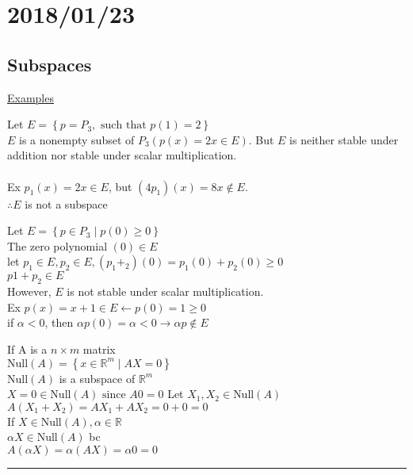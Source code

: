 \documentclass[12pt]{article}
\newcommand{\real}[0]{\mathbb{R}}
\newenvironment{proof}{\block[Proof]}{\endblock}
\newenvironment{examples}{\shownto{-,compact}\underline{Examples}\enumerate}{\endenumerate\divider\endshownto}
\newcommand{\bb}[1]{\left\{#1\right\}}
\newcommand{\divider}[0]{\par\textcolor{lightgray}{\rule{\textwidth}{0.1pt}}}
\begin{document}
\section{2018/01/23}

\subsection{Subspaces}

\begin{examples}
	\item Let $E = \bb{p = P_3, \text{ such that } p(1) = 2}$ \\
	$E$ is a nonempty subset of $P_3 (p(x) = 2x \in E)$. But $E$ is neither stable under addition nor stable under scalar multiplication. \\\\
	Ex $p_1(x) = 2x \in E$, but $(4p_1)(x) = 8x \notin E$. \\
	$\therefore E$ is not a subspace 
	
	\item Let $E = \bb{p \in P_3 \mid p(0) \ge 0}$ \\
	The zero polynomial $(0) \in E$ \\
	let $p_1 \in E, p_2 \in E, (p_1 + _2)(0) = p_1(0) + p_2(0) \ge 0$ \\
	$p1 + p_2 \in E$ \\
	However, $E$ is not stable under scalar multiplication. \\
	Ex $p(x) = x + 1 \in E \leftarrow p(0) = 1 \ge 0$ \\
	if $\alpha < 0$, then $\alpha p(0) = \alpha < 0 \rightarrow \alpha p \notin E$
	
	\item If A is a $n \times m$ matrix \\
	$\text{Null}(A) = \bb{x \in \real^m \mid AX = 0}$ \\
	$\text{Null}(A)$ is a subspace of $\real^m$ \\
	\begin{proof}
		$X = 0 \in \text{Null}(A) \text{ since } A0 = 0$
		Let $X_1, X_2 \in \text{Null}(A)$ \\
		$A(X_1 + X_2) = AX_1 + AX_2 = 0 + 0 = 0$ \\
		If $X \in \text{Null}(A), \alpha \in \real$ \\
		$\alpha X \in \text{Null}(A)$ bc \\
		$A(\alpha X) = \alpha (AX) = \alpha 0 = 0$
	\end{proof}
\end{examples}
\end{document}
